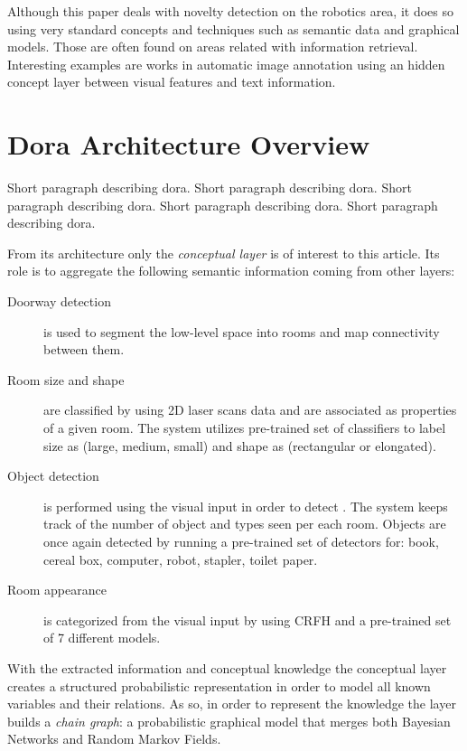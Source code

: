 \documentclass[runningheads,a4paper]{llncs}
\begin{document}
Although this paper deals with novelty detection on the robotics area, it does so using very
standard concepts and techniques such as semantic data and graphical models.
Those are often found on areas related with information retrieval.
Interesting examples are works in automatic image annotation using an hidden concept layer between visual features and text information\cite{zhang2005probabilistic}.

\section{Dora Architecture Overview}
Short paragraph describing dora. Short paragraph describing dora. Short paragraph describing dora. Short paragraph describing dora. Short paragraph describing dora.

From its architecture only the \emph{conceptual layer} is of interest to this article.
Its role is to aggregate the following semantic information coming from other layers:

\begin{description}
 \item[Doorway detection] is used to segment the low-level space into rooms and map connectivity between them.
 \item[Room size and shape] are classified by using 2D laser scans data and are associated as properties of a given room. The system utilizes pre-trained set of classifiers to label size as (large, medium, small) and shape as (rectangular or elongated).
 \item[Object detection] is performed using the visual input in order to detect . The system keeps track of the number of object and types seen per each room. Objects are once again detected by running a pre-trained set of detectors for: book, cereal box, computer, robot, stapler, toilet paper.
 \item[Room appearance] is categorized from the visual input by using CRFH and a pre-trained set of 7 different models.
\end{description}

With the extracted information and conceptual knowledge the conceptual layer creates a structured probabilistic representation
in order to model all known variables and their relations.
As so, in order to represent the knowledge the layer builds a \emph{chain graph}:
a probabilistic graphical model that merges both Bayesian Networks and Random Markov Fields.
\end{document}
